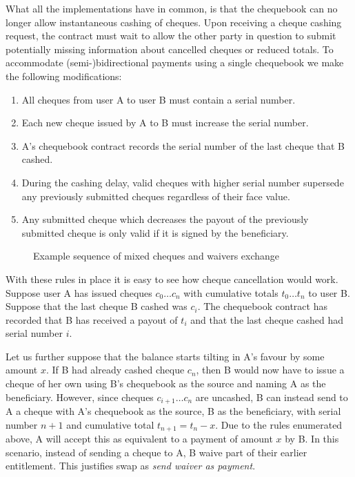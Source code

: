 What all the implementations have in common, is that the chequebook can no longer allow instantaneous cashing of cheques. Upon receiving a cheque cashing request, the contract must wait to allow the other party in question to submit potentially missing information about cancelled cheques or reduced totals. To accommodate (semi-)bidirectional payments using a single chequebook we make the following modifications:

\begin{enumerate}
    \item All cheques from user A to user B must contain a serial number.
    \item Each new cheque issued by A to B must increase the serial number.
    \item A's chequebook contract records the serial number of the last cheque that B cashed.
    \item During the cashing delay, valid cheques with higher serial number supersede any previously submitted cheques regardless of their face value.
    \item Any submitted cheque which decreases the payout of the previously submitted cheque is only valid if it is signed by the beneficiary.
\end{enumerate}


\begin{figure}[htbp]
\centering

\caption{Example sequence of mixed cheques and waivers exchange}
\label{fig:waivers-diagram}
\end{figure}

With these rules in place it is easy to see how cheque cancellation would work. Suppose user A has issued cheques $c_0 \ldots c_n$ with cumulative totals $t_0 \ldots t_n$ to user B. Suppose that the last cheque B cashed was $c_i$. The chequebook contract has recorded that B has received a payout of $t_i$ and that the last cheque cashed had serial number $i$.

Let us further suppose that the balance starts tilting in A's favour by some amount $x$. If B had already cashed cheque $c_n$, then B would now have to issue a cheque of her own using B's chequebook as the source and naming A as the beneficiary. However, since cheques $c_{i+1} \ldots c_n$  are uncashed, B can instead send to A a cheque with A's chequebook as the source, B as the beneficiary, with serial number $n+1$ and cumulative total $t_{n+1} = t_n - x$. Due to the rules enumerated above, A will accept this as equivalent to a payment of amount $x$ by B.  In this scenario, instead of sending a cheque to A, B waive part of their earlier entitlement. This justifies swap as \emph{send waiver as payment}.

